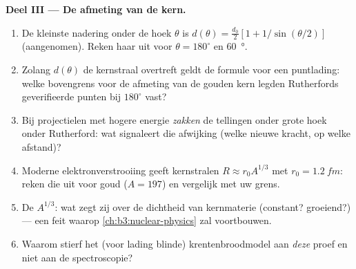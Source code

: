 \begin{problem}
\medskip\noindent\textbf{Deel III --- De afmeting van de kern.}
\begin{enumerate}[resume]
  \item De kleinste nadering onder de hoek $\theta$ is $d(\theta) =
        \tfrac{d_0}2[1 + 1/\sin(\theta/2)]$ (aangenomen). Reken haar uit
        voor $\theta = 180^\circ$ en \qty{60}{\degree}.
  \item Zolang $d(\theta)$ de kernstraal overtreft geldt de formule voor
        een puntlading: welke bovengrens voor de afmeting van de gouden
        kern legden Rutherfords geverifieerde punten bij $180^\circ$ vast?
  \item Bij projectielen met hogere energie \emph{zakken} de tellingen
        onder grote hoek onder Rutherford: wat signaleert die afwijking
        (welke nieuwe kracht, op welke afstand)?
  \item Moderne elektronverstrooiing geeft kernstralen $R
        \approx r_0A^{1/3}$ met $r_0 = \qty{1.2}{fm}$: reken die uit voor goud
        ($A = 197$) en vergelijk met uw grens.
  \item De $A^{1/3}$: wat zegt zij over de dichtheid van kernmaterie
        (constant? groeiend?) --- een feit waarop
        \cref{ch:b3:nuclear-physics} zal voortbouwen.
  \item Waarom stierf het (voor lading blinde) krentenbroodmodel aan
        \emph{deze} proef en niet aan de spectroscopie?
\end{enumerate}


\end{problem}
